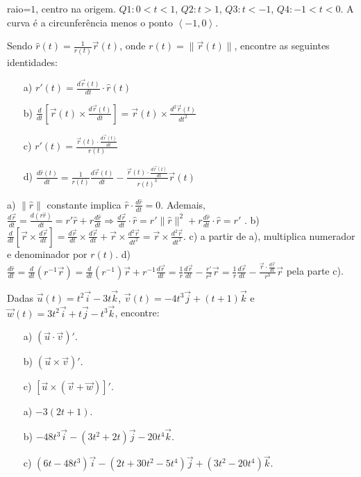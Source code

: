 \begin{resp}raio=$1$, centro na origem. $Q1: 0<t<1$, $Q2:t>1$, $Q3:t<-1$, $Q4:-1<t<0$. A curva é a circunferência menos o ponto $\left<-1,0\right>$.
\end{resp}

\begin{exer}
Sendo $\hat{r}(t)=\frac{1}{r(t)} \vec{r}(t)$, onde $r(t)=\|\vec{r}(t)\|$,  encontre as seguintes identidades:
\begin{itemize}
\item[a)] $\displaystyle r'(t) = \frac{d\vec{r}(t)}{dt}\cdot \hat{r}(t)$
\item[b)] $\displaystyle \frac{d}{dt}\left[\vec{r}(t)\times\frac{d\vec{r}(t)}{dt}\right]=\vec{r}(t)\times\frac{d^2\vec{r}(t)}{dt^2}$
\item[c)] $\displaystyle r'(t)=\frac{\vec{r}(t)\cdot\frac{d\vec{r}(t)}{dt}}{r(t)}$
\item[d)] $\displaystyle \frac{d\hat{r}(t)}{dt}=\frac{1}{r(t)} \frac{d\vec{r}(t)}{dt}-\frac{\vec{r}(t)\cdot\frac{d\vec{r}(t)}{dt}}{r(t)^3} \vec{r}(t)$
\end{itemize}
\end{exer}
\begin{resp}
a) $\|\hat{r}\|$ constante implica $\hat{r} \cdot \frac{d\hat{r}}{dt}=0$. Ademais, $ \frac{d\vec{r}}{dt} = \frac{d(r \hat{r})}{dt} = r' \hat{r} + r \frac{d\hat{r}}{dt} \Rightarrow \frac{d\vec{r}}{dt} \cdot \hat{r} =
r' \|\hat{r}\|^2 + r \frac{d\hat{r}}{dt} \cdot \hat{r} = r' $
. b) $\frac{d}{dt} \left[ \vec{r} \times \frac{d\vec{r}}{dt} \right] =
\frac{d \vec{r}}{dt} \times \frac{d \vec{r}}{dt} + \vec{r} \times \frac{d^2 \vec{r}}{dt^2} = \vec{r} \times \frac{d^2 \vec{r}}{dt^2} $. c) a partir de a), multiplica numerador e denominador por $r(t)$. d) $\frac{d\hat{r}}{dt} =
\frac{d}{dt} \left( r^{-1} \vec{r} \right) = \frac{d}{dt} \left( r^{-1} \right) \vec{r} + r^{-1} \frac{d \vec{r}}{dt} = \frac{1}{r} \frac{d\vec{r}}{dt} - \frac{r'}{r^2} \vec{r} = \frac{1}{r} \frac{d \vec{r}}{dt} - \frac{ \vec{r} \cdot \frac{d \vec{r}}{dt} }{r^3} \vec{r} $ pela parte c).
\end{resp}
\begin{exer}Dadas $\vec{u}(t)=t^2\vec{i}-3t\vec{k}$, $\vec{v}(t)=-4t^3\vec{j}+(t+1)\vec{k}$ e $\vec{w}(t)=3t^2\vec{i}+t\vec{j}-t^3\vec{k}$, encontre:
\begin{itemize}
 \item[a)] $(\vec{u}\cdot \vec{v})'$.
 \item[b)] $(\vec{u}\times \vec{v})'$.
 \item[c)] $\left[\vec{u}\times (\vec{v}+\vec{w})\right]'$.
\end{itemize}
\end{exer}
\begin{resp}
\begin{itemize}
 \item[a)] $-3(2t+1)$.
 \item[b)] $-48t^3\vec{i}-(3t^2+2t)\vec{j}-20t^4\vec{k}$.
 \item[c)] $(6t-48t^3)\vec{i}-(2t+30t^2-5t^4)\vec{j}+(3t^2-20t^4)\vec{k}$.
\end{itemize}
\end{resp}
